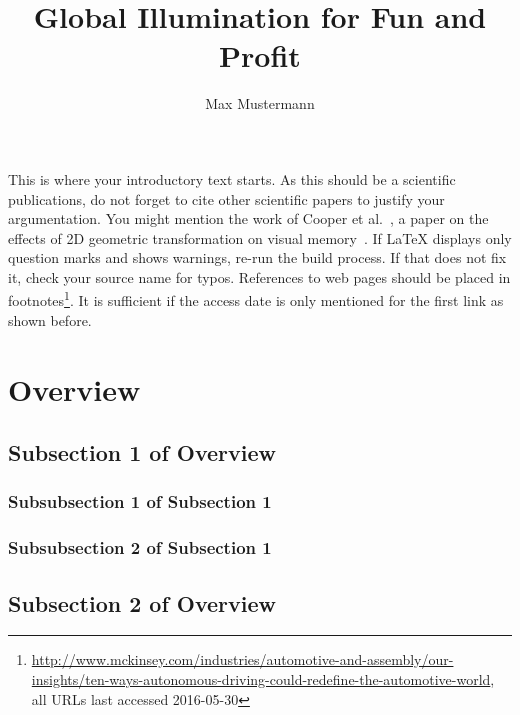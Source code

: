 \documentclass[journal]{vgtc}                %
\title{Global Illumination for Fun and Profit}
\author{Max Mustermann}
\begin{document}

\maketitle

%
%

This is where your introductory text starts. As this should be a scientific publications, do not forget to cite other scientific papers to justify your argumentation. You might mention the work of Cooper et al.~\cite{Cooper2006}, a paper on the effects of 2D geometric transformation on visual memory~\cite{Lam2006}. If LaTeX displays only question marks \cite{IWonderIfThisSourceExists2013} and shows warnings, re-run the build process. If that does not fix it, check your source name for typos. References to web pages should be placed in footnotes\footnote{\url{http://www.mckinsey.com/industries/automotive-and-assembly/our-insights/ten-ways-autonomous-driving-could-redefine-the-automotive-world}, \newline all URLs last accessed 2016-05-30}. It is sufficient if the access date is only mentioned for the first link as shown before.

\section{Overview}

\subsection{Subsection 1 of Overview}

\subsubsection{Subsubsection 1 of Subsection 1}

\subsubsection{Subsubsection 2 of Subsection 1}

\subsection{Subsection 2 of Overview}
\end{document}
